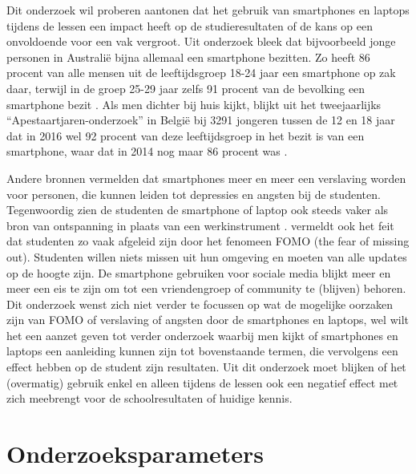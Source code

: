 Dit onderzoek wil proberen aantonen dat het gebruik van smartphones en laptops tijdens de lessen een impact heeft op de studieresultaten of de kans op een onvoldoende voor een vak vergroot. Uit onderzoek bleek dat bijvoorbeeld jonge personen in Australië bijna allemaal een smartphone bezitten. Zo heeft 86 procent van alle mensen uit de leeftijdsgroep 18-24 jaar een smartphone op zak daar, terwijl in de groep 25-29 jaar zelfs 91 procent van de bevolking een smartphone bezit \autocite{Farley2015}. Als men dichter bij huis kijkt, blijkt uit het tweejaarlijks “Apestaartjaren-onderzoek” in België bij 3291 jongeren tussen de 12 en 18 jaar dat in 2016 wel 92 procent van deze leeftijdsgroep in het bezit is van een smartphone, waar dat in 2014 nog maar 86 procent was \autocite{Apestaartjaren2016}.

Andere bronnen \autocite{MatarBoumosleh2017} vermelden dat smartphones meer en meer een verslaving worden voor personen, die kunnen leiden tot depressies en angsten bij de studenten. Tegenwoordig zien de studenten de smartphone of laptop ook steeds vaker als bron van ontspanning in plaats van een werkinstrument \autocite{Baert2018}. \textcite{Baert2018} vermeldt ook het feit dat studenten zo vaak afgeleid zijn door het fenomeen FOMO (the fear of missing out). Studenten willen niets missen uit hun omgeving en moeten van alle updates op de hoogte zijn. De smartphone gebruiken voor sociale media blijkt meer en meer een eis te zijn om tot een vriendengroep of community te (blijven) behoren. Dit onderzoek wenst zich niet verder te focussen op wat de mogelijke oorzaken zijn van FOMO of verslaving of angsten door de smartphones en laptops, wel wilt het een aanzet geven tot verder onderzoek waarbij men kijkt of smartphones en laptops een aanleiding kunnen zijn tot bovenstaande termen, die vervolgens een effect hebben op de student zijn resultaten. Uit dit onderzoek moet blijken of het (overmatig) gebruik enkel en alleen tijdens de lessen ook een negatief effect met zich meebrengt voor de schoolresultaten of huidige kennis.

\section{Onderzoeksparameters}
\label{sec:onderzoeksparameters}

